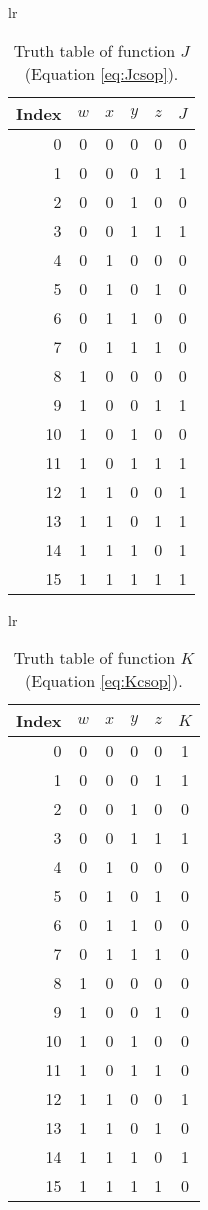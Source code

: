 \documentclass[12pt]{article}
\begin{document}
\begin{table}[!hbt]
\begin{center}

\begin{tabular}{lr}
  \begin{tabular}[t]{r|cccc|c}
Index&$w$&$x$&$y$&$z$&$J$\\
\hline
0  &0&0&0&0 &0\\
1  &0&0&0&1 &1\\
2  &0&0&1&0 &0\\
3  &0&0&1&1 &1\\
4  &0&1&0&0 &0\\
5  &0&1&0&1 &0\\
6  &0&1&1&0 &0\\
7  &0&1&1&1 &0\\
8  &1&0&0&0 &0\\
9  &1&0&0&1 &1\\
10 &1&0&1&0 &0\\
11 &1&0&1&1 &1\\
12 &1&1&0&0 &1\\
13 &1&1&0&1 &1\\
14 &1&1&1&0 &1\\
15 &1&1&1&1 &1\\

  \end{tabular}
\end{tabular}
\end{center}

\caption{Truth table of function $J$ (Equation \ref{eq:Jcsop}).}
\label{tab:tt}
\end{table}

\begin{table}[!hbt]
\begin{center}
\begin{tabular}{lr}
  \begin{tabular}[t]{r|cccc|c}
Index&$w$&$x$&$y$&$z$&$K$\\
\hline
0  &0&0&0&0 &1\\
1  &0&0&0&1 &1\\
2  &0&0&1&0 &0\\
3  &0&0&1&1 &1\\
4  &0&1&0&0 &0\\
5  &0&1&0&1 &0\\
6  &0&1&1&0 &0\\
7  &0&1&1&1 &0\\
8  &1&0&0&0 &0\\
9  &1&0&0&1 &0\\
10 &1&0&1&0 &0\\
11 &1&0&1&1 &0\\
12 &1&1&0&0 &1\\
13 &1&1&0&1 &0\\
14 &1&1&1&0 &1\\
15 &1&1&1&1 &0\\

  \end{tabular}
\end{tabular}
\end{center}
\caption{Truth table of function $K$ (Equation \ref{eq:Kcsop}).}
\label{tab:tt}
\end{table}
\end{document}
